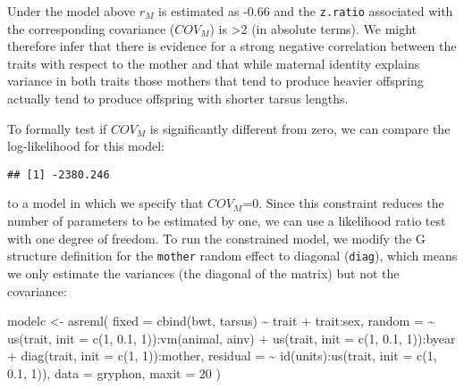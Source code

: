 \documentclass[
  12pt,
]{book}
\newenvironment{Shaded}{\begin{snugshade}}{\end{snugshade}}
\newcommand{\AttributeTok}[1]{\textcolor[rgb]{0.77,0.63,0.00}{#1}}
\newcommand{\DecValTok}[1]{\textcolor[rgb]{0.00,0.00,0.81}{#1}}
\newcommand{\FloatTok}[1]{\textcolor[rgb]{0.00,0.00,0.81}{#1}}
\newcommand{\FunctionTok}[1]{\textcolor[rgb]{0.00,0.00,0.00}{#1}}
\newcommand{\NormalTok}[1]{#1}
\newcommand{\OtherTok}[1]{\textcolor[rgb]{0.56,0.35,0.01}{#1}}
\newcommand{\SpecialCharTok}[1]{\textcolor[rgb]{0.00,0.00,0.00}{#1}}
\begin{document}
Under the model above \(r_M\) is estimated as -0.66 and the \texttt{z.ratio} associated with the corresponding covariance (\(COV_M\)) is \textgreater2 (in absolute terms). We might therefore infer that there is evidence for a strong negative correlation between the traits with respect to the mother and that while maternal identity explains variance in both traits those mothers that tend to produce heavier offspring actually tend to produce offspring with shorter tarsus lengths.

To formally test if \(COV_M\) is significantly different from zero, we can compare the log-likelihood for this model:

\begin{Shaded}
\end{Shaded}

\begin{verbatim}
## [1] -2380.246
\end{verbatim}

to a model in which we specify that \(COV_M\)=0. Since this constraint reduces the number of parameters to be estimated by one, we can use a likelihood ratio test with one degree of freedom. To run the constrained model, we modify the G structure definition for the \texttt{mother} random effect to diagonal (\texttt{diag}), which means we only estimate the variances (the diagonal of the matrix) but not the covariance:

\begin{Shaded}
\begin{Highlighting}[]
\NormalTok{modelc }\OtherTok{\textless{}{-}} \FunctionTok{asreml}\NormalTok{(}
  \AttributeTok{fixed =} \FunctionTok{cbind}\NormalTok{(bwt, tarsus) }\SpecialCharTok{\textasciitilde{}}\NormalTok{ trait }\SpecialCharTok{+}\NormalTok{ trait}\SpecialCharTok{:}\NormalTok{sex,}
  \AttributeTok{random =} \SpecialCharTok{\textasciitilde{}} \FunctionTok{us}\NormalTok{(trait, }\AttributeTok{init =} \FunctionTok{c}\NormalTok{(}\DecValTok{1}\NormalTok{, }\FloatTok{0.1}\NormalTok{, }\DecValTok{1}\NormalTok{))}\SpecialCharTok{:}\FunctionTok{vm}\NormalTok{(animal, ainv) }\SpecialCharTok{+}
    \FunctionTok{us}\NormalTok{(trait, }\AttributeTok{init =} \FunctionTok{c}\NormalTok{(}\DecValTok{1}\NormalTok{, }\FloatTok{0.1}\NormalTok{, }\DecValTok{1}\NormalTok{))}\SpecialCharTok{:}\NormalTok{byear }\SpecialCharTok{+}
    \FunctionTok{diag}\NormalTok{(trait, }\AttributeTok{init =} \FunctionTok{c}\NormalTok{(}\DecValTok{1}\NormalTok{, }\DecValTok{1}\NormalTok{))}\SpecialCharTok{:}\NormalTok{mother,}
  \AttributeTok{residual =} \SpecialCharTok{\textasciitilde{}} \FunctionTok{id}\NormalTok{(units)}\SpecialCharTok{:}\FunctionTok{us}\NormalTok{(trait, }\AttributeTok{init =} \FunctionTok{c}\NormalTok{(}\DecValTok{1}\NormalTok{, }\FloatTok{0.1}\NormalTok{, }\DecValTok{1}\NormalTok{)),}
  \AttributeTok{data =}\NormalTok{ gryphon,}
  \AttributeTok{maxit =} \DecValTok{20}
\NormalTok{)}
\end{Highlighting}
\end{Shaded}
\end{document}
